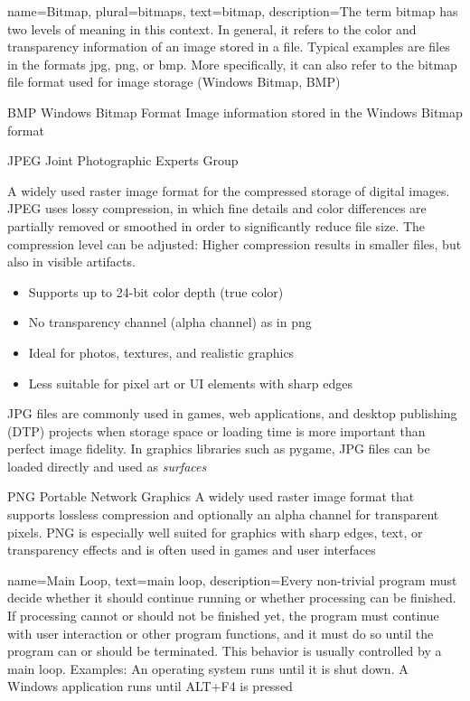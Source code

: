 {
	name={Bitmap},
	plural={bitmaps},
	text={bitmap},
	description={The term bitmap has two levels of meaning in this context. In general, it refers to the color and transparency information of an image stored in a file. Typical examples are files in the formats \Gls{jpg}, \Gls{png}, or 	\Gls{bmp}.	More specifically, it can also refer to the bitmap file format used	for image storage (Windows Bitmap, BMP)}
}

	{BMP}            %
	{Windows Bitmap Format}  %
	{Image information stored in the Windows Bitmap format} %


	{JPEG}            %
	{Joint Photographic Experts Group}  %
	{A widely used raster image format for the compressed storage of digital images.
	JPEG uses lossy compression, in which fine details and color differences are partially removed or smoothed in order to significantly reduce file size.
	The compression level can be adjusted: Higher compression results in smaller files, but also in visible artifacts.
	\begin{itemize}
		\item Supports up to 24-bit color depth (true color)
		\item No transparency channel (alpha channel) as in \gls{png}
		\item Ideal for photos, textures, and realistic graphics
		\item Less suitable for pixel art or UI elements with sharp edges
	\end{itemize}
	JPG files are commonly used in games, web applications, and	desktop publishing (DTP) projects when storage space or loading time is more important than perfect image fidelity.	In graphics libraries such as \gls{pygame}, JPG files can be loaded directly and used as \textit{surfaces}} %


	{PNG}            %
	{Portable Network Graphics}  %
	{A widely used raster image format that supports lossless compression and optionally an alpha channel for transparent pixels. PNG is especially well suited for graphics with sharp edges, text, or transparency effects and is often used in games and user interfaces} %

{
	name={Main Loop},
	text={main loop},
	description={Every non-trivial program must decide whether it should continue running or whether processing can be finished. If processing cannot or should not be finished yet, the program must continue with user interaction or other program functions, and it must do so until the program can or should be terminated. This behavior is usually controlled by a main loop.	Examples: An operating system runs until it is shut down. A Windows application runs until ALT+F4 is pressed}
}

